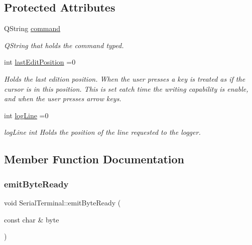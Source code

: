 \subsection*{Protected Attributes}
\begin{DoxyCompactItemize}
\item 
\mbox{\label{classSerialTerminal_a4f76b31e778ed594dc6395909076f33d}} 
Q\+String \hyperlink{classSerialTerminal_a4f76b31e778ed594dc6395909076f33d}{command}
\begin{DoxyCompactList}\small\item\em Q\+String that holds the command typed. \end{DoxyCompactList}\item 
\mbox{\label{classSerialTerminal_a6bd4818e245556d7c90892837ff4e8b3}} 
int \hyperlink{classSerialTerminal_a6bd4818e245556d7c90892837ff4e8b3}{last\+Edit\+Position} =0
\begin{DoxyCompactList}\small\item\em Holds the last edition position. When the user presses a key is treated as if the cursor is in this position. This is set eatch time the writing capability is enable, and when the user presses arrow keys. \end{DoxyCompactList}\item 
\mbox{\label{classSerialTerminal_a79d3aa77b5c157012f443de04004b00f}} 
int \hyperlink{classSerialTerminal_a79d3aa77b5c157012f443de04004b00f}{log\+Line} =0
\begin{DoxyCompactList}\small\item\em log\+Line int Holds the position of the line requested to the logger. \end{DoxyCompactList}\end{DoxyCompactItemize}


\subsection{Member Function Documentation}
\mbox{\label{classSerialTerminal_a2307f483e520204281ab5a0bbb262651}} 
\subsubsection{\texorpdfstring{emit\+Byte\+Ready}{emitByteReady}}
{\footnotesize\ttfamily void Serial\+Terminal\+::emit\+Byte\+Ready (\begin{DoxyParamCaption}\item[{const char \&}]{byte }\end{DoxyParamCaption})\hspace{0.3cm}{\ttfamily [signal]}}



